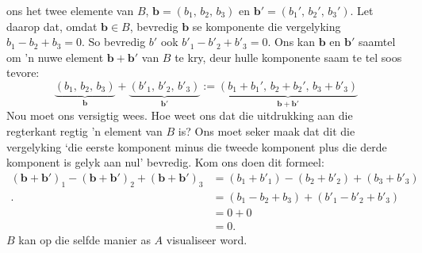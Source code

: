 \documentclass[a4paper,11pt]{book}
\theoremstyle{definition}
\newcommand{\be}{\begin{equation}}
\newcommand{\ee}{\end{equation}}
\newcommand{\ve}[1]{\mathbf{#1}}
\begin{document}
ons het twee elemente van $B$, $\ve{b} = (b_1, \,b_2, \,b_3)$ en $\ve{b}'
= (b_1', \, b_2', \, b_3')$. Let daarop dat, omdat $\ve{b}\in B$, bevredig
$\ve{b}$ se komponente die vergelyking $b_1 - b_2 + b_3 = 0$. So bevredig
$b'$ ook $b'_1 - b'_2 + b'_3 = 0$. Ons kan $\ve{b}$ en $\ve{b}'$ saamtel om
'n nuwe element $\ve{b} + \ve{b}'$ van $B$ te kry, deur hulle komponente
saam te tel soos tevore:
\be \label{new_add_in_B}
\underbrace{(b_1, \, b_2, \, b_3)}_{\ve{b}} + \underbrace{(b'_1, \,b'_2, \,
b'_3)}_{\ve{b}'} := \underbrace{(b_1 + b_1', \, b_2 + b_2', \, b_3 +
b'_3)}_{\ve{b} + \ve{b}'}
\ee
Nou moet ons versigtig wees. Hoe weet ons dat die uitdrukking aan die
regterkant regtig 'n element van $B$ is? Ons moet seker maak dat dit die
vergelyking `die eerste komponent minus die tweede komponent plus die derde
komponent is gelyk aan nul' bevredig. Kom ons doen dit formeel:
\begin{align*}
	(\ve{b} + \ve{b}')_1 - (\ve{b}+\ve{b}')_2 + (\ve{b}+\ve{b}')_3 &= (b_1
	+ b'_1) - (b_2 + b'_2) + (b_3 + b'_3) \\.
	&= (b_1 - b_2 + b_3) + (b'_1 - b'_2 + b'_3) \\
	&= 0 + 0 \\
	&= 0.
\end{align*}
$B$ kan op die selfde manier as $A$ visualiseer word.
\end{document}
